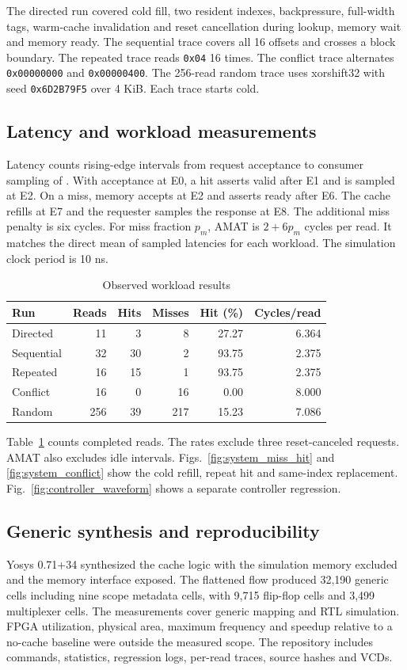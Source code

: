 \documentclass[conference]{IEEEtran}
\begin{document}
The directed run covered cold fill, two resident indexes, backpressure, full-width tags, warm-cache invalidation and reset cancellation during lookup, memory wait and memory ready. The sequential trace covers all 16 offsets and crosses a block boundary. The repeated trace reads \texttt{0x04} 16 times. The conflict trace alternates \texttt{0x00000000} and \texttt{0x00000400}. The 256-read random trace uses xorshift32 with seed \texttt{0x6D2B79F5} over 4 KiB. Each trace starts cold.

\subsection{Latency and workload measurements}
Latency counts rising-edge intervals from request acceptance to consumer sampling of . With acceptance at E0, a hit asserts valid after E1 and is sampled at E2. On a miss, memory accepts at E2 and asserts ready after E6. The cache refills at E7 and the requester samples the response at E8. The additional miss penalty is six cycles. For miss fraction $p_m$, AMAT is $2+6p_m$ cycles per read. It matches the direct mean of sampled latencies for each workload. The simulation clock period is 10 ns.

\begin{table}[!t]
\caption{Observed workload results}
\label{tab:results}
\centering\small
\begin{tabular}{lrrrrr}
\toprule
Run & Reads & Hits & Misses & Hit (\%) & Cycles/read\\\midrule
Directed & 11 & 3 & 8 & 27.27 & 6.364\\
Sequential & 32 & 30 & 2 & 93.75 & 2.375\\
Repeated & 16 & 15 & 1 & 93.75 & 2.375\\
Conflict & 16 & 0 & 16 & 0.00 & 8.000\\
Random & 256 & 39 & 217 & 15.23 & 7.086\\
\bottomrule
\end{tabular}
\end{table}
Table~\ref{tab:results} counts completed reads. The rates exclude three reset-canceled requests. AMAT also excludes idle intervals. Figs.~\ref{fig:system_miss_hit} and \ref{fig:system_conflict} show the cold refill, repeat hit and same-index replacement. Fig.~\ref{fig:controller_waveform} shows a separate controller regression.

\subsection{Generic synthesis and reproducibility}
Yosys 0.71+34 synthesized the cache logic with the simulation memory excluded and the memory interface exposed. The flattened flow produced 32,190 generic cells including nine scope metadata cells, with 9,715 flip-flop cells and 3,499 multiplexer cells. The measurements cover generic mapping and RTL simulation. FPGA utilization, physical area, maximum frequency and speedup relative to a no-cache baseline were outside the measured scope. The repository includes commands, statistics, regression logs, per-read traces, source hashes and VCDs.
\end{document}
